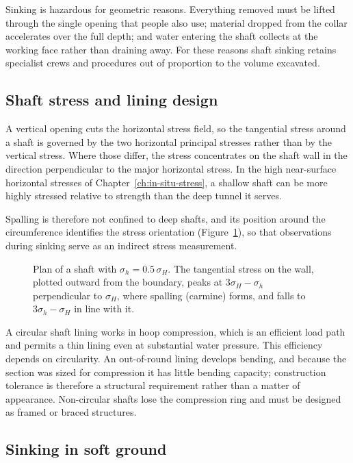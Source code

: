 Sinking is hazardous for geometric reasons. Everything
removed must be lifted through the single opening that people also use;
material dropped from the collar accelerates over the full depth; and water
entering the shaft collects at the working face rather than draining away.
For these reasons shaft sinking retains specialist crews and procedures
out of proportion to the volume excavated.

\subsection{Shaft stress and lining design}
\label{sec:shaft-stress-lining}

A vertical opening cuts the horizontal stress field, so the tangential stress
around a shaft is governed by the two horizontal principal stresses rather
than by the vertical stress. Where those differ, the stress concentrates on
the shaft wall in the direction perpendicular to the major horizontal stress.
In the high near-surface horizontal stresses of
Chapter~\ref{ch:in-situ-stress}, a shallow shaft can be more highly stressed
relative to strength than the deep tunnel it serves.

Spalling is therefore not confined to deep shafts, and its position around
the circumference
identifies the stress orientation (Figure~\ref{fig:shaft-stress}), so that observations during sinking
serve as an indirect stress measurement.

\begin{figure}[htbp]
\centering
{}
\caption{Plan of a shaft with $\sigma_h = 0.5\,\sigma_H$. The tangential stress on the wall, plotted outward from the boundary, peaks at $3\sigma_H - \sigma_h$ perpendicular to $\sigma_H$, where spalling (carmine) forms, and falls to $3\sigma_h - \sigma_H$ in line with it.}
\label{fig:shaft-stress}
\end{figure}

A circular shaft lining works in hoop compression, which is an efficient load
path and permits a thin lining even at substantial water pressure. This efficiency
depends on circularity. An out-of-round lining develops bending, and
because the section was sized for compression it has little bending capacity;
construction tolerance is therefore a structural requirement rather than a
matter of appearance. Non-circular shafts lose the compression ring
and must be designed as framed or braced structures.

\subsection{Sinking in soft ground}
\label{sec:soft-ground-shafts}

